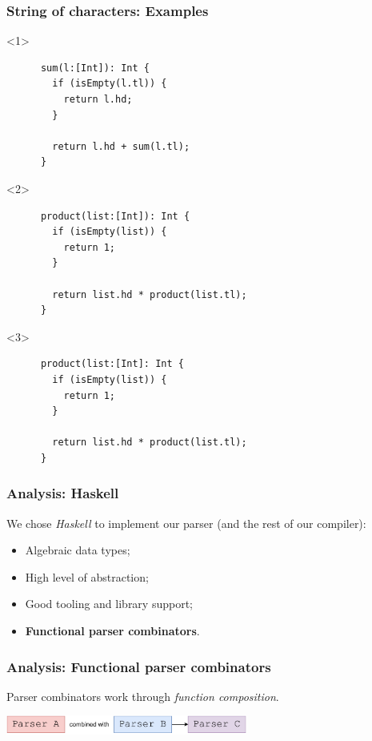 \documentclass{beamer}
\begin{document}
\begin{frame}[fragile]
  \frametitle{String of characters: Examples}

  \begin{onlyenv}<1>
    \begin{verbatim}
      sum(l:[Int]): Int {
        if (isEmpty(l.tl)) {
          return l.hd;
        }

        return l.hd + sum(l.tl);
      }
    \end{verbatim}
  \end{onlyenv}

  \begin{onlyenv}<2>
    \begin{verbatim}
      product(list:[Int]): Int {
        if (isEmpty(list)) {
          return 1;
        }

        return list.hd * product(list.tl);
      }
    \end{verbatim}
  \end{onlyenv}

  \begin{onlyenv}<3>
    \begin{verbatim}
      product(list:[Int]: Int {
        if (isEmpty(list)) {
          return 1;
        }

        return list.hd * product(list.tl);
      }
    \end{verbatim}
  \end{onlyenv}
\end{frame}


\begin{frame}
  \frametitle{Analysis: Haskell}

  We chose \textit{Haskell} to implement our parser (and the rest of our compiler):

  \begin{itemize}
    \item Algebraic data types;
    \item High level of abstraction;
    \item Good tooling and library support;
    \item \textbf{Functional parser combinators}.
  \end{itemize}
\end{frame}

\begin{frame}
  \frametitle{Analysis: Functional parser combinators}

  Parser combinators work through \textit{function composition}.

  \begin{center}
    \includegraphics[width=300px]{figures/parser_combinator.pdf}
  \end{center}
\end{frame}
\end{document}
